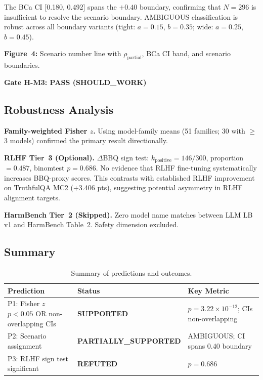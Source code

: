 The BCa CI [0.180, 0.492] spans the $+0.40$ boundary, confirming that $N{=}296$ is insufficient to resolve the scenario boundary. AMBIGUOUS classification is robust across all boundary variants (tight: $a{=}0.15$, $b{=}0.35$; wide: $a{=}0.25$, $b{=}0.45$).

\textbf{Figure~4:} Scenario number line with $\rho_{\text{partial}}$, BCa CI band, and scenario boundaries.

\textbf{Gate H-M3: PASS (SHOULD\_WORK)}

\subsection{Robustness Analysis}

\textbf{Family-weighted Fisher $z$.} Using model-family means (51 families; 30 with $\geq$3 models) confirmed the primary result directionally.

\textbf{RLHF Tier~3 (Optional).} $\Delta$BBQ sign test: $k_{\text{positive}}{=}146/300$, proportion$=0.487$, binomtest $p=0.686$. No evidence that RLHF fine-tuning systematically increases BBQ-proxy scores. This contrasts with established RLHF improvement on TruthfulQA MC2 (+3.406 pts), suggesting potential asymmetry in RLHF alignment targets.

\textbf{HarmBench Tier~2 (Skipped).} Zero model name matches between LLM LB v1 and HarmBench Table~2. Safety dimension excluded.

\subsection{Summary}

\begin{table}[h]
\centering
\caption{Summary of predictions and outcomes.}
\label{tab:summary}
\begin{tabular}{@{}lll@{}}
\toprule
Prediction & Status & Key Metric \\
\midrule
P1: Fisher $z$ $p < 0.05$ OR non-overlapping CIs & \textbf{SUPPORTED} & $p = 3.22 \times 10^{-12}$; CIs non-overlapping \\
P2: Scenario assignment & \textbf{PARTIALLY\_SUPPORTED} & AMBIGUOUS; CI spans 0.40 boundary \\
P3: RLHF sign test significant & \textbf{REFUTED} & $p = 0.686$ \\
\bottomrule
\end{tabular}
\end{table}
